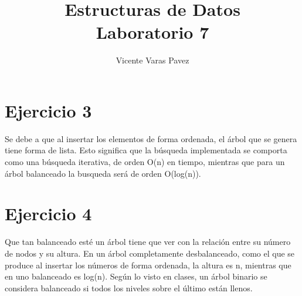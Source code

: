 \documentclass[11pt]{article}
\begin{document}
\title{Estructuras de Datos\\ \large Laboratorio 7}
\author{Vicente Varas Pavez}
\maketitle
\section *{Ejercicio 3}
Se debe a que al insertar los elementos de forma ordenada, el árbol que se genera tiene forma de lista. Esto significa que la búsqueda implementada se comporta como una búsqueda iterativa, de orden O(n) en tiempo, mientras que para un árbol balanceado la busqueda será de orden O(log(n)).
\section *{Ejercicio 4}
Que tan balanceado esté un árbol tiene que ver con la relación entre su número de nodos y su altura. En un árbol completamente desbalanceado, como el que se produce al insertar  los números de forma ordenada, la altura es n, mientras que en uno balanceado es log(n). Según lo visto en clases, un árbol binario se considera balanceado si todos los niveles sobre el último están llenos.
\end{document}
